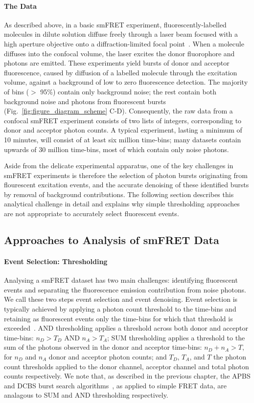 \paragraph{The Data}
As described above, in a basic smFRET experiment, fluorescently-labelled molecules in dilute solution diffuse freely through a laser beam focused with a high aperture objective onto a diffraction-limited focal point~\cite{schuler05}.  When a molecule diffuses into the confocal volume, the laser excites the donor fluorophore and photons are emitted. These experiments yield bursts of donor and acceptor fluorescence, caused by diffusion of a labelled molecule through the excitation volume, against a background of low to zero fluorescence detection. The majority of bins ($>$ 95\%) contain only background noise; the rest contain both background noise and photons from fluorescent bursts (Fig.~\ref{fig:figure_diagram_scheme} C-D). Consequently, the raw data from a confocal smFRET experiment consists of two lists of integers, corresponding to donor and acceptor photon counts. A typical experiment, lasting a minimum of 10 minutes, will consist of at least six million time-bins; many datasets contain upwards of 30 million time-bins, most of which contain only noise photons. 

Aside from the delicate experimental apparatus, one of the key challenges in smFRET experiments is therefore the selection of photon bursts originating from flourescent excitation events, and the accurate denoising of these identified bursts by removal of background contributions. The following section describes this analytical challenge in detail and explains why simple thresholding approaches are not appropriate to accurately select fluorescent events.

\subsection{Approaches to Analysis of smFRET Data}
\paragraph{Event Selection: Thresholding}
Analysing a smFRET dataset has two main challenges: identifying fluorescent events and separating the fluorescence emission contribution from noise photons. We call these two steps event selection and event denoising. Event selection is typically achieved by applying a photon count threshold to the time-bins and retaining as fluorescent events only the time-bins for which that threshold is exceeded~\cite{deniz01, gell06, ying00}. AND thresholding applies a threshold across both donor and acceptor time-bins: $n_D > T_D$ AND $n_A > T_A$; SUM thresholding applies a threshold to the sum of the photons observed in the donor and acceptor time-bins: $n_D  + n_A > T$, for $n_D$ and  $n_A$ donor and acceptor photon counts; and $T_D$, $T_A$, and $T$ the photon count thresholds applied to the donor channel, acceptor channel and total photon counts respectively. We note that, as described in the previous chapter, the APBS and DCBS burst search algorithms~\cite{nir06}, as applied to simple FRET data, are analagous to SUM and AND thresholding respectively.

